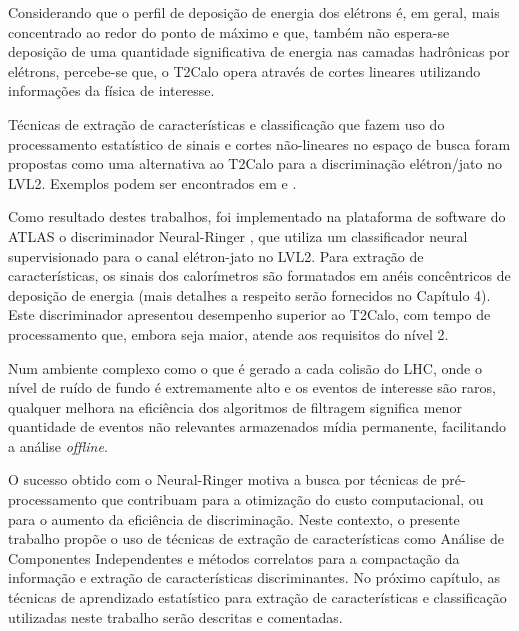 Considerando que o perfil de deposição de energia dos elétrons é,
em geral, mais concentrado ao redor do ponto de máximo e que,
também não espera-se deposição de uma quantidade significativa de
energia nas camadas hadrônicas por elétrons, percebe-se que, o
T2Calo opera através de cortes lineares utilizando informações da
física de interesse.

Técnicas de extração de características e classificação que fazem
uso do processamento estatístico de sinais e cortes não-lineares no
espaço de busca foram propostas como uma alternativa ao T2Calo para
a discriminação elétron/jato no LVL2. Exem\-plos podem ser
encontrados em \cite{article:anjos:2006} e
\cite{article:herman:2006}.

Como resultado destes trabalhos, foi implementado na plataforma de
software do ATLAS o discriminador Neural-Ringer
\cite{article:anjos:2006,tese:andre:2006}, que utiliza um
classificador neural supervisionado para o canal elétron-jato no
LVL2. Para extração de características, os sinais dos calorímetros
são formatados em anéis concêntricos de deposição de energia (mais
detalhes a respeito serão fornecidos no Capítulo 4). Este
discriminador apresentou desempenho superior ao T2Calo, com tempo de
processamento que, embora seja maior, atende aos requisitos do nível
2.

Num ambiente complexo como o que é gerado a cada colisão do LHC,
onde o nível de ruído de fundo é extremamente alto e os eventos de
interesse são raros, qualquer melhora na eficiência dos algoritmos
de filtragem significa menor quantidade de eventos não relevantes
armazenados mídia permanente, facilitando a análise
\textit{offline}.

O sucesso obtido com o Neural-Ringer motiva a busca por técnicas de
pré-processamento que contribuam para a otimização do custo
computacional, ou para o aumento da eficiência de discriminação.
Neste contexto, o presente trabalho propõe o uso de técnicas de
extração de características como Análise de Componentes
Independentes e métodos correlatos para a compactação da informação
e extração de características discriminantes. No próximo capítulo,
as técnicas de aprendizado estatístico para extração de
características e classificação utilizadas neste trabalho serão
descritas e comentadas.
